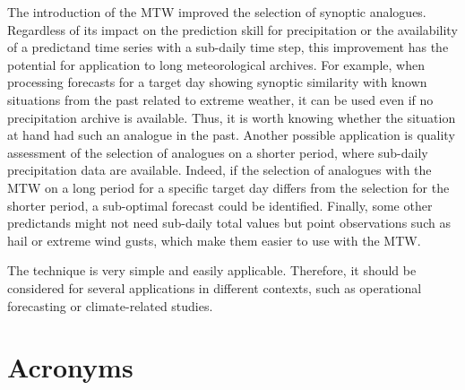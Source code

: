\documentclass[hess, manuscript]{copernicus}
\begin{document}
	The introduction of the MTW improved the selection of synoptic analogues. Regardless of its impact on the prediction skill for precipitation or the availability of a predictand time series with a sub-daily time step, this improvement has the potential for application to long meteorological archives. For example, when processing forecasts for a target day showing synoptic similarity with known situations from the past related to extreme weather, it can be used even if no precipitation archive is available. Thus, it is worth knowing whether the situation at hand had such an analogue in the past. Another possible application is quality assessment of the selection of analogues on a shorter period, where sub-daily precipitation data are available. Indeed, if the selection of analogues with the MTW on a long period for a specific target day differs from the selection for the shorter period, a sub-optimal forecast could be identified. Finally, some other predictands might not need sub-daily total values but point observations such as hail or extreme wind gusts, which make them easier to use with the MTW.
	
	The technique is very simple and easily applicable. Therefore, it should be considered for several applications in different contexts, such as operational forecasting or climate-related studies.
	
	
	\appendix
	\section{Acronyms}    %
	
\end{document}
